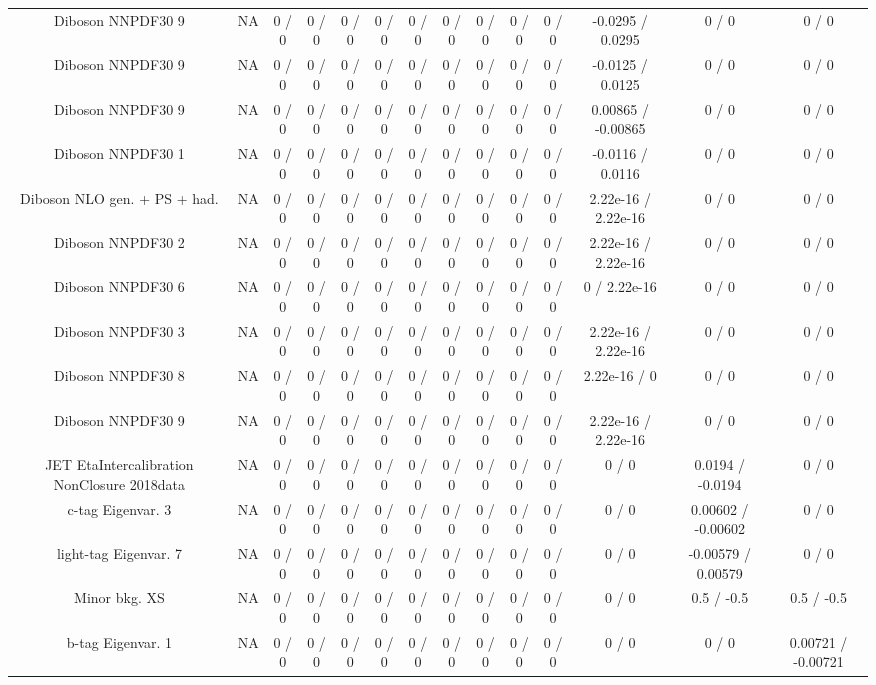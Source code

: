 \documentclass[10pt]{article}
\begin{document}
\begin{table}[htbp]
\begin{center}
\begin{tabular}{|c|c|c|c|c|c|c|c|c|c|c|c|c|c|}
  Diboson NNPDF30 9 &    NA    & 0 / 0 & 0 / 0 & 0 / 0 & 0 / 0 & 0 / 0 & 0 / 0 & 0 / 0 & 0 / 0 & 0 / 0 & -0.0295 / 0.0295 & 0 / 0 & 0 / 0 \\ 
  Diboson NNPDF30 9 &    NA    & 0 / 0 & 0 / 0 & 0 / 0 & 0 / 0 & 0 / 0 & 0 / 0 & 0 / 0 & 0 / 0 & 0 / 0 & -0.0125 / 0.0125 & 0 / 0 & 0 / 0 \\ 
  Diboson NNPDF30 9 &    NA    & 0 / 0 & 0 / 0 & 0 / 0 & 0 / 0 & 0 / 0 & 0 / 0 & 0 / 0 & 0 / 0 & 0 / 0 & 0.00865 / -0.00865 & 0 / 0 & 0 / 0 \\ 
  Diboson NNPDF30 1 &    NA    & 0 / 0 & 0 / 0 & 0 / 0 & 0 / 0 & 0 / 0 & 0 / 0 & 0 / 0 & 0 / 0 & 0 / 0 & -0.0116 / 0.0116 & 0 / 0 & 0 / 0 \\ 
  Diboson NLO gen. + PS + had. &    NA    & 0 / 0 & 0 / 0 & 0 / 0 & 0 / 0 & 0 / 0 & 0 / 0 & 0 / 0 & 0 / 0 & 0 / 0 & 2.22e-16 / 2.22e-16 & 0 / 0 & 0 / 0 \\ 
  Diboson NNPDF30 2 &    NA    & 0 / 0 & 0 / 0 & 0 / 0 & 0 / 0 & 0 / 0 & 0 / 0 & 0 / 0 & 0 / 0 & 0 / 0 & 2.22e-16 / 2.22e-16 & 0 / 0 & 0 / 0 \\ 
  Diboson NNPDF30 6 &    NA    & 0 / 0 & 0 / 0 & 0 / 0 & 0 / 0 & 0 / 0 & 0 / 0 & 0 / 0 & 0 / 0 & 0 / 0 & 0 / 2.22e-16 & 0 / 0 & 0 / 0 \\ 
  Diboson NNPDF30 3 &    NA    & 0 / 0 & 0 / 0 & 0 / 0 & 0 / 0 & 0 / 0 & 0 / 0 & 0 / 0 & 0 / 0 & 0 / 0 & 2.22e-16 / 2.22e-16 & 0 / 0 & 0 / 0 \\ 
  Diboson NNPDF30 8 &    NA    & 0 / 0 & 0 / 0 & 0 / 0 & 0 / 0 & 0 / 0 & 0 / 0 & 0 / 0 & 0 / 0 & 0 / 0 & 2.22e-16 / 0 & 0 / 0 & 0 / 0 \\ 
  Diboson NNPDF30 9 &    NA    & 0 / 0 & 0 / 0 & 0 / 0 & 0 / 0 & 0 / 0 & 0 / 0 & 0 / 0 & 0 / 0 & 0 / 0 & 2.22e-16 / 2.22e-16 & 0 / 0 & 0 / 0 \\ 
  JET EtaIntercalibration NonClosure 2018data &    NA    & 0 / 0 & 0 / 0 & 0 / 0 & 0 / 0 & 0 / 0 & 0 / 0 & 0 / 0 & 0 / 0 & 0 / 0 & 0 / 0 & 0.0194 / -0.0194 & 0 / 0 \\ 
  c-tag Eigenvar. 3 &    NA    & 0 / 0 & 0 / 0 & 0 / 0 & 0 / 0 & 0 / 0 & 0 / 0 & 0 / 0 & 0 / 0 & 0 / 0 & 0 / 0 & 0.00602 / -0.00602 & 0 / 0 \\ 
  light-tag Eigenvar. 7 &    NA    & 0 / 0 & 0 / 0 & 0 / 0 & 0 / 0 & 0 / 0 & 0 / 0 & 0 / 0 & 0 / 0 & 0 / 0 & 0 / 0 & -0.00579 / 0.00579 & 0 / 0 \\ 
  Minor bkg. XS &    NA    & 0 / 0 & 0 / 0 & 0 / 0 & 0 / 0 & 0 / 0 & 0 / 0 & 0 / 0 & 0 / 0 & 0 / 0 & 0 / 0 & 0.5 / -0.5 & 0.5 / -0.5 \\ 
  b-tag Eigenvar. 1 &    NA    & 0 / 0 & 0 / 0 & 0 / 0 & 0 / 0 & 0 / 0 & 0 / 0 & 0 / 0 & 0 / 0 & 0 / 0 & 0 / 0 & 0 / 0 & 0.00721 / -0.00721 \\ 

\end{tabular}
\end{center}
\end{table}
\end{document}
